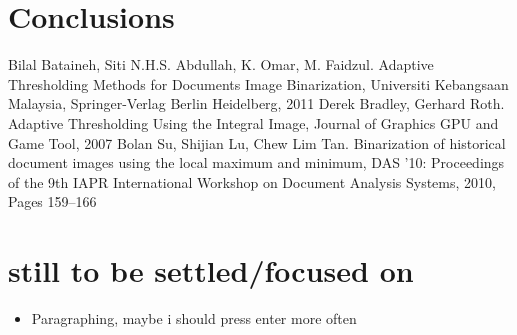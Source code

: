 \documentclass[sigconf]{acmart}
\begin{document}
\section{Conclusions}

\begin{thebibliography}{h}
Bilal Bataineh, Siti N.H.S. Abdullah, K. Omar, M. Faidzul. Adaptive Thresholding Methods for Documents Image Binarization, Universiti Kebangsaan Malaysia,  Springer-Verlag Berlin Heidelberg, 2011
Derek Bradley, Gerhard Roth. Adaptive Thresholding Using the Integral Image, Journal of Graphics GPU and Game Tool, 2007
Bolan Su, Shijian Lu, Chew Lim Tan. Binarization of historical document images using the local maximum and minimum, DAS '10: Proceedings of the 9th IAPR International Workshop on Document Analysis Systems, 2010, Pages 159–166

\end{thebibliography}

\newpage

\section{still to be settled/focused on}

\begin{itemize}
    \item Paragraphing, maybe i should press enter more often
    
\end{itemize}
\end{document}
